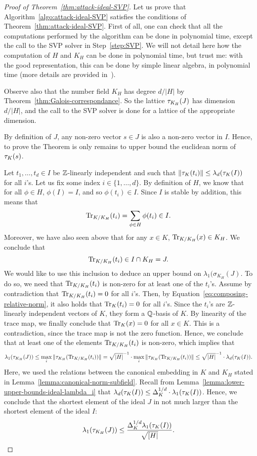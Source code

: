 \begin{proof}[Proof of Theorem~\ref{thm:attack-ideal-SVP}]
Let us prove that Algorithm~\ref{algo:attack-ideal-SVP} satisfies the conditions of Theorem~\ref{thm:attack-ideal-SVP}. First of all, one can check that all the computations performed by the algorithm can be done in polynomial time, except the call to the SVP solver in Step~\ref{step:SVP}. We will not detail here how the computation of $H$ and $K_H$ can be done in polynomial time, but trust me: with the good representation, this can be done by simple linear algebra, in polynomial time (more details are provided in~\cite{BGP22}).

Observe also that the number field $K_H$ has degree $d/|H|$ by Theorem~\ref{thm:Galois-correspondance}. So the lattice $\tau_{K_H}(J)$ has dimension $d/|H|$, and the call to the SVP solver is done for a lattice of the appropriate dimension.

By definition of $J$, any non-zero vector $s \in J$ is also a non-zero vector in $I$. Hence, to prove the Theorem is only remains to upper bound the euclidean norm of $\tau_K(s)$.

Let $t_1, \dots, t_d \in I$ be $\mathbb{Z}$-linearly independent and such that $\|\tau_K(t_i)\| \leq \lambda_d(\tau_K(I))$ for all $i$'s.
Let us fix some index $i \in \{1, \dots, d\}$.
By definition of $H$, we know that for all $\phi \in H$, $\phi(I) = I$, and so $\phi(t_i) \in I$. Since $I$ is stable by addition, this means that 
\[\mathrm{Tr}_{K/K_H}(t_i) = \sum_{\phi \in H} \phi(t_i) \in I.\]
Moreover, we have also seen above that for any $x \in K$, $\mathrm{Tr}_{K/K_H}(x) \in K_H$. We conclude that 
\[\mathrm{Tr}_{K/K_H}(t_i) \in I \cap K_H = J.\]
We would like to use this inclusion to deduce an upper bound on $\lambda_1(\sigma_{K_H}(J)$. To do so, we need that $\mathrm{Tr}_{K/K_H}(t_i)$ is non-zero for at least one of the $t_i$'s. Assume by contradiction that $\mathrm{Tr}_{K/K_H}(t_i) = 0$ for all $i$'s. Then, by Equation~\eqref{eq:composing-relative-norm}, it also holds that $\mathrm{Tr}_{K}(t_i) = 0$ for all $i$'s. Since the $t_i$'s are $\mathbb{Z}$-linearly independent vectors of $K$, they form a $\mathbb{Q}$-basis of $K$. By linearity of the trace map, we finally conclude that $\mathrm{Tr}_K(x) = 0$ for all $x \in K$. This is a contradiction, since the trace map is not the zero function. Hence, we conclude that at least one of the elements $\mathrm{Tr}_{K/K_H}(t_i)$ is non-zero, which implies that
\[\lambda_1(\tau_{K_H}(J)) \leq \max_i \|\tau_{K_H}(\mathrm{Tr}_{K/K_H}(t_i))\| = \sqrt{|H|}^{-1} \cdot \max_i \|\tau_{K_H}(\mathrm{Tr}_{K/K_H}(t_i))\| \leq \sqrt{|H|}^{-1} \cdot \lambda_d(\tau_K(I)).\]
Here, we used the relations between the canonical embedding in $K$ and $K_H$ stated in Lemma~\ref{lemma:canonical-norm-subfield}. Recall from Lemma~\ref{lemma:lower-upper-bounds-ideal-lambda_i} that $\lambda_d(\tau_K(I)) \leq \Delta_K^{1/d} \cdot \lambda_1(\tau_K(I))$. Hence, we conclude that the shortest element of the ideal $J$ in not much larger than the shortest element of the ideal $I$:
\[\lambda_1(\tau_{K_H}(J)) \leq \frac{\Delta_K^{1/d} \lambda_1(\tau_K(I))}{\sqrt{[H|}}.\]


\end{proof}
